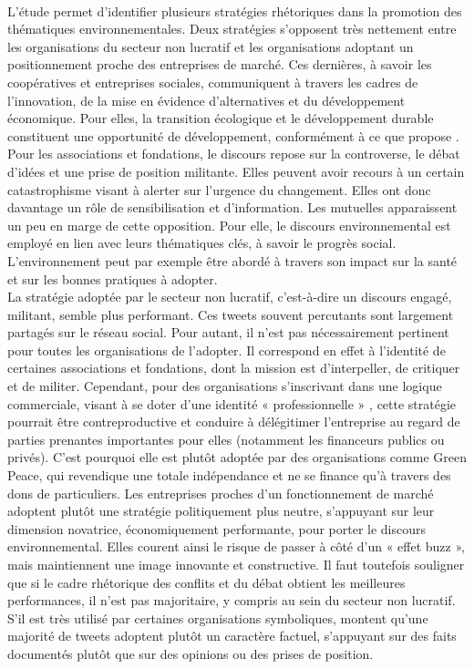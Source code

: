 \\

            L’étude permet d’identifier plusieurs stratégies rhétoriques dans la promotion des thématiques environnementales. Deux stratégies s’opposent très nettement entre les organisations du secteur non lucratif et les organisations adoptant un positionnement proche des entreprises de marché. Ces dernières, à savoir les coopératives et entreprises sociales, communiquent à travers les cadres de l’innovation, de la mise en évidence d’alternatives et du développement économique. Pour elles, la transition écologique et le développement durable constituent une opportunité de développement, conformément à ce que propose \textcite{cretieneau2010economie}. Pour les associations et fondations, le discours repose sur la controverse, le débat d’idées et une prise de position militante. Elles peuvent avoir recours à un certain catastrophisme visant à alerter sur l’urgence du changement. Elles ont donc davantage un rôle de sensibilisation et d’information. Les mutuelles apparaissent un peu en marge de cette opposition. Pour elle, le discours environnemental est employé en lien avec leurs thématiques clés, à savoir le progrès social. L’environnement peut par exemple être abordé à travers son impact sur la santé et sur les bonnes pratiques à adopter. \\

            La stratégie adoptée par le secteur non lucratif, c’est-à-dire un discours engagé, militant, semble plus performant. Ces tweets souvent percutants sont largement partagés sur le réseau social. Pour autant, il n’est pas nécessairement pertinent pour toutes les organisations de l’adopter. Il correspond en effet à l’identité de certaines associations et fondations, dont la mission est d’interpeller, de critiquer et de militer. Cependant, pour des organisations s’inscrivant dans une logique commerciale, visant à se doter d’une identité « professionnelle » \parencite{dart2004being}, cette stratégie pourrait être contreproductive et conduire à délégitimer l’entreprise au regard de parties prenantes importantes pour elles (notamment les financeurs publics ou privés). C’est pourquoi elle est plutôt adoptée par des organisations comme Green Peace, qui revendique une totale indépendance et ne se finance qu’à travers des dons de particuliers. Les entreprises proches d’un fonctionnement de marché adoptent plutôt une stratégie politiquement plus neutre, s’appuyant sur leur dimension novatrice, économiquement performante, pour porter le discours environnemental. Elles courent ainsi le risque de passer à côté d’un « effet buzz », mais maintiennent une image innovante et constructive. Il faut toutefois souligner que si le cadre rhétorique des conflits et du débat obtient les meilleures performances, il n’est pas majoritaire, y compris au sein du secteur non lucratif. S’il est très utilisé par certaines organisations symboliques, \textcite{mariaux2017promouvoir} montent qu’une majorité de tweets adoptent plutôt un caractère factuel, s’appuyant sur des faits documentés plutôt que sur des opinions ou des prises de position. \\


